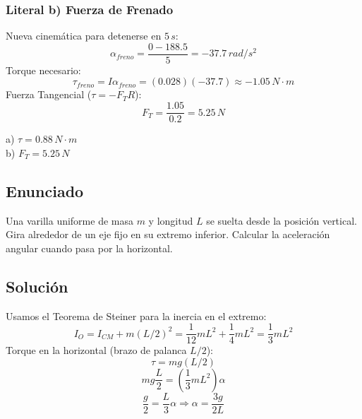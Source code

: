 \documentclass[12pt, a4paper]{article}
\begin{document}
\subsubsection*{Literal b) Fuerza de Frenado}
Nueva cinemática para detenerse en $5 \, \si{s}$:
$$ \alpha_{freno} = \frac{0 - 188.5}{5} = -37.7 \, \si{rad/s^2} $$
Torque necesario:
$$ \tau_{freno} = I \alpha_{freno} = (0.028)(-37.7) \approx -1.05 \, \si{N \cdot m} $$
Fuerza Tangencial ($ \tau = -F_T R $):
$$ F_T = \frac{1.05}{0.2} = 5.25 \, \si{N} $$

\begin{tcolorbox}[colback=green!5!white, colframe=green!50!black, title=Respuesta]
a) $\tau = 0.88 \, \si{N \cdot m}$ \\
b) $F_T = 5.25 \, \si{N}$
\end{tcolorbox}

\newpage

\subsection*{Enunciado}
Una varilla uniforme de masa $m$ y longitud $L$ se suelta desde la posición vertical. Gira alrededor de un eje fijo en su extremo inferior. Calcular la aceleración angular cuando pasa por la horizontal.

\begin{center}
\end{center}

\subsection*{Solución}
Usamos el Teorema de Steiner para la inercia en el extremo:
$$ I_O = I_{CM} + m(L/2)^2 = \frac{1}{12}mL^2 + \frac{1}{4}mL^2 = \frac{1}{3}mL^2 $$
Torque en la horizontal (brazo de palanca $L/2$):
$$ \tau = mg(L/2) $$
$$ mg \frac{L}{2} = \left( \frac{1}{3}mL^2 \right) \alpha $$
$$ \frac{g}{2} = \frac{L}{3} \alpha \Rightarrow \alpha = \frac{3g}{2L} $$
\end{document}
